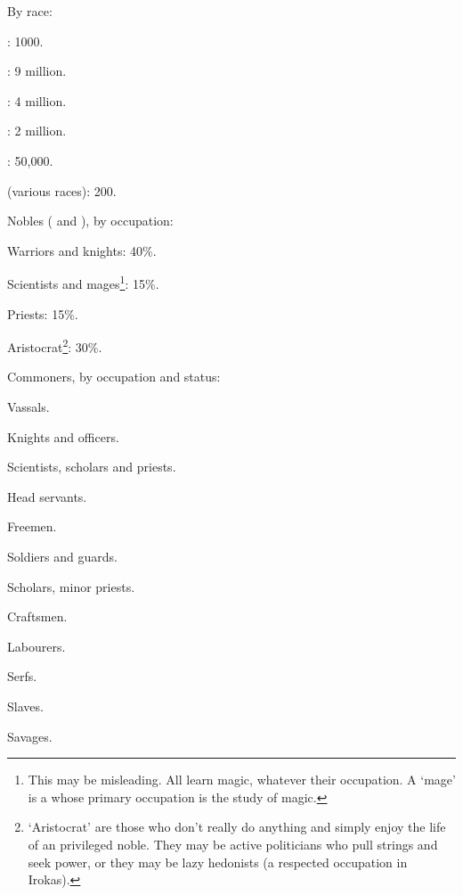 \bi
  \item By race: 
    \bi
      \item \Dragons{}: 1000. 
      \item \Scathae: 9 million. 
      \item \Humans: 4 million. 
      \item \Meccara: 2 million. 
      \item \Rachyth: 50,000. 
      \item \Dragonbrothers{} (various races): 200. 
    \ei
  \item Nobles (\dragons{} and \dragonbrothers{}), by occupation:
    \bi
      \item Warriors and knights: 40\%. 
      \item Scientists and mages\footnote{This may be misleading. All \dragons{} learn magic, whatever their occupation. A \dragon{} `mage' is a \dragon{} whose primary occupation is the study of magic.}: 15\%. 
      \item Priests: 15\%. 
      \item Aristocrat\footnote{`Aristocrat' \dragons{} are those who don't really do anything and simply enjoy the life of an privileged noble. They may be active politicians who pull strings and seek power, or they may be lazy hedonists (a respected occupation in Irokas).}: 30\%. 
    \ei
  \item Commoners, by occupation and status: 
    \bi
      \item Vassals. 
        \bi
          \item Knights and officers. 
          \item Scientists, scholars and priests. 
          \item Head servants. 
        \ei
      \item Freemen. 
        \bi
          \item Soldiers and guards. 
          \item Scholars, minor priests. 
          \item Craftsmen. 
          \item Labourers. 
        \ei
      \item Serfs. 
      \item Slaves. 
      \item Savages. 
    \ei
\ei

